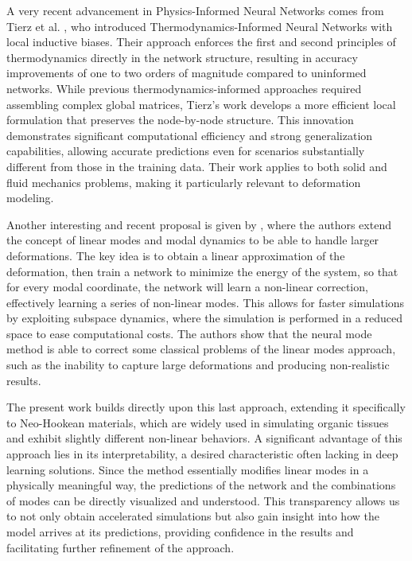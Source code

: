 A very recent advancement in Physics-Informed Neural Networks comes from Tierz et al. \cite{Tierz_Alfaro_González_Chinesta_Cueto_2025}, who introduced Thermodynamics-Informed Neural Networks with local inductive biases. Their approach enforces the first and second principles of thermodynamics directly in the network structure, resulting in accuracy improvements of one to two orders of magnitude compared to uninformed networks. While previous thermodynamics-informed approaches required assembling complex global matrices, Tierz's work develops a more efficient local formulation that preserves the node-by-node structure. This innovation demonstrates significant computational efficiency and strong generalization capabilities, allowing accurate predictions even for scenarios substantially different from those in the training data. Their work applies to both solid and fluid mechanics problems, making it particularly relevant to deformation modeling.

Another interesting and recent proposal is given by \cite{Wang_Du_Coros_Thomaszewski_2024}, where the authors extend the concept of linear modes and modal dynamics \cite{Pentland_Williams_1989} to be able to handle larger deformations. The key idea is to obtain a linear approximation of the deformation, then train a network to minimize the energy of the system, so that for every modal coordinate, the network will learn a non-linear correction, effectively learning a series of non-linear modes. This allows for faster simulations by exploiting subspace dynamics, where the simulation is performed in a reduced space to ease computational costs. The authors show that the neural mode method is able to correct some classical problems of the linear modes approach, such as the inability to capture large deformations and producing non-realistic results. 

The present work builds directly upon this last approach, extending it specifically to Neo-Hookean materials, which are widely used in simulating organic tissues and exhibit slightly different non-linear behaviors. A significant advantage of this approach lies in its interpretability, a desired characteristic often lacking in deep learning solutions. Since the method essentially modifies linear modes in a physically meaningful way, the predictions of the network and the combinations of modes can be directly visualized and understood. This transparency allows us to not only obtain accelerated simulations but also gain insight into how the model arrives at its predictions, providing confidence in the results and facilitating further refinement of the approach. 